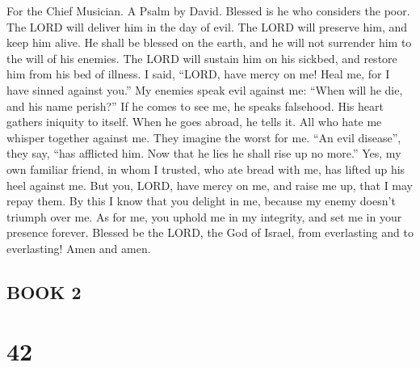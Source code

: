 For the Chief Musician. A Psalm by David.  Blessed is he
who considers the poor. The LORD will deliver him in the day of evil.
 The LORD will preserve him, and keep him alive. He shall
be blessed on the earth, and he will not surrender him to the will of
his enemies.  The LORD will sustain him on his sickbed,
and restore him from his bed of illness.  I said, ``LORD,
have mercy on me! Heal me, for I have sinned against you.''
 My enemies speak evil against me: ``When will he die, and
his name perish?''  If he comes to see me, he speaks
falsehood. His heart gathers iniquity to itself. When he goes abroad, he
tells it.  All who hate me whisper together against me.
They imagine the worst for me.  ``An evil disease'', they
say, ``has afflicted him. Now that he lies he shall rise up no more.''
 Yes, my own familiar friend, in whom I trusted, who ate
bread with me, has lifted up his heel against me.  But
you, LORD, have mercy on me, and raise me up, that I may repay them.
 By this I know that you delight in me, because my enemy
doesn't triumph over me.  As for me, you uphold me in my
integrity, and set me in your presence forever.  Blessed
be the LORD, the God of Israel, from everlasting and to everlasting!
Amen and amen.

\hypertarget{book-2}{%
\subsection{BOOK 2}\label{book-2}}

\hypertarget{section-41}{%
\section{42}\label{section-41}}

